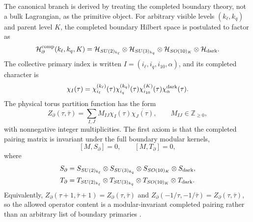 \documentclass[11pt]{article}
\newcommand{\kell}{k_{\ell}}
\newcommand{\kq}{k_q}
\newcommand{\Kpar}{K}
\newcommand{\Zboundary}{Z_{\partial}}
\begin{document}
The canonical branch is derived by treating the completed boundary theory, not a
bulk Lagrangian, as the primitive object.  For arbitrary visible levels
$(\kell,\kq)$ and parent level $\Kpar$, the completed boundary Hilbert space is
postulated to factor as
\begin{equation}
\label{eq:completed-boundary-hilbert-general}
 \mathcal H_{\partial}^{\rm comp}(\kell,\kq,\Kpar)
 =
 \mathcal H_{SU(2)_{\kell}}
 \otimes
 \mathcal H_{SU(3)_{\kq}}
 \otimes
 \mathcal H_{SO(10)_{\Kpar}}
 \otimes
 \mathcal H_{\rm dark}.
\end{equation}
The collective primary index is written
$I=(i_{\ell},i_q,i_{10},\alpha)$, and its completed character is
\begin{equation}
\label{eq:completed-character-general}
 \chi_I(\tau)
 =
 \chi^{(\kell)}_{i_{\ell}}(\tau)
 \chi^{(\kq)}_{i_q}(\tau)
 \chi^{(\Kpar)}_{i_{10}}(\tau)
 \chi^{\rm dark}_{\alpha}(\tau).
\end{equation}
The physical torus partition function has the form
\begin{equation}
\label{eq:zboundary-section-two}
 \Zboundary(\tau,\bar\tau)
 =
 \sum_{I,J}M_{IJ}\chi_I(\tau)\overline{\chi_J(\tau)},
 \qquad
 M_{IJ}\in\mathbb Z_{\ge0},
\end{equation}
with nonnegative integer multiplicities.  The first axiom is that the completed
pairing matrix is invariant under the full boundary modular kernels,
\begin{equation}
\label{eq:section-two-modular-invariance}
 [M,S_{\partial}]=0,
 \qquad
 [M,T_{\partial}]=0,
\end{equation}
where
\begin{align}
\label{eq:section-two-modular-kernels}
 S_{\partial}
 &=
 S_{SU(2)_{\kell}}
 \otimes S_{SU(3)_{\kq}}
 \otimes S_{SO(10)_{\Kpar}}
 \otimes S_{\rm dark},\nonumber\\
 T_{\partial}
 &=
 T_{SU(2)_{\kell}}
 \otimes T_{SU(3)_{\kq}}
 \otimes T_{SO(10)_{\Kpar}}
 \otimes T_{\rm dark}.
\end{align}
Equivalently,
$\Zboundary(\tau+1,\bar\tau+1)=\Zboundary(\tau,\bar\tau)$ and
$\Zboundary(-1/\tau,-1/\bar\tau)=\Zboundary(\tau,\bar\tau)$, so the allowed
operator content is a modular-invariant completed pairing rather than an
arbitrary list of boundary primaries \cite{cardy1986,cappelli1987}.
\end{document}
